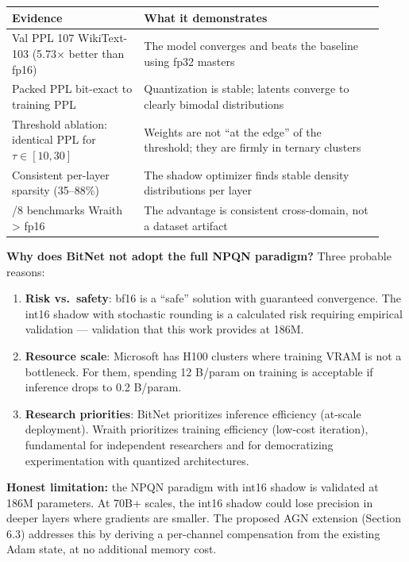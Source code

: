 {\def\LTcaptype{none} %
{\footnotesize\setlength{\tabcolsep}{3pt}
\begin{longtable}[]{@{}>{\raggedright\arraybackslash}p{0.33\linewidth}>{\raggedright\arraybackslash}p{0.60\linewidth}@{}}
\toprule\noalign{}
Evidence & What it demonstrates \\
\midrule\noalign{}
\endhead
\bottomrule\noalign{}
\endlastfoot
Val PPL 107 WikiText-103 (5.73× better than fp16) & The model converges
and beats the baseline using fp32 masters \\
Packed PPL bit-exact to training PPL & Quantization is stable; latents
converge to clearly bimodal distributions \\
Threshold ablation: identical PPL for \(\tau \in [10, 30]\) & Weights
are not ``at the edge'' of the threshold; they are firmly in ternary
clusters \\
Consistent per-layer sparsity (35--88\%) & The shadow optimizer finds
stable density distributions per layer \\
8/8 benchmarks Wraith \textgreater{} fp16 & The advantage is consistent
cross-domain, not a dataset artifact \\
\end{longtable}
}
}

\textbf{Why does BitNet not adopt the full NPQN paradigm?} Three
probable reasons:

\begin{enumerate}
\def\labelenumi{\arabic{enumi}.}
\tightlist
\item
  \textbf{Risk vs.~safety}: bf16 is a ``safe'' solution with guaranteed
  convergence. The int16 shadow with stochastic rounding is a calculated
  risk requiring empirical validation --- validation that this work
  provides at 186M.
\item
  \textbf{Resource scale}: Microsoft has H100 clusters where training
  VRAM is not a bottleneck. For them, spending 12 B/param on training is
  acceptable if inference drops to 0.2 B/param.
\item
  \textbf{Research priorities}: BitNet prioritizes inference efficiency
  (at-scale deployment). Wraith prioritizes training efficiency
  (low-cost iteration), fundamental for independent researchers and for
  democratizing experimentation with quantized architectures.
\end{enumerate}

\textbf{Honest limitation:} the NPQN paradigm with int16 shadow is
validated at 186M parameters. At 70B+ scales, the int16 shadow could
lose precision in deeper layers where gradients are smaller. The
proposed AGN extension (Section 6.3) addresses this by deriving a
per-channel compensation from the existing Adam state, at no additional
memory cost.

